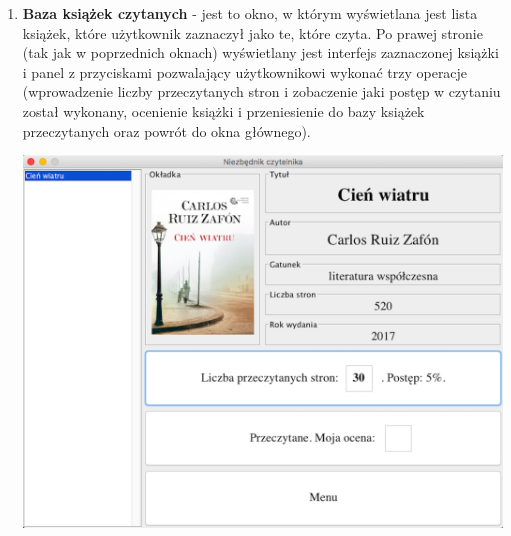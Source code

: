 \documentclass[a4paper,10pt]{article}
\begin{document}
\begin{enumerate}
\item \textbf{Baza książek czytanych } - jest to okno, w którym wyświetlana jest lista książek, które użytkownik zaznaczył jako te, które czyta. Po prawej stronie (tak jak w poprzednich oknach)
wyświetlany jest interfejs zaznaczonej książki i panel z przyciskami pozwalający użytkownikowi wykonać trzy operacje (wprowadzenie liczby przeczytanych stron i zobaczenie jaki postęp w czytaniu został wykonany, ocenienie książki i przeniesienie do bazy książek przeczytanych oraz powrót do okna głównego).
\begin{center}
\includegraphics[scale=0.18]{BazaKsiazekCzytanych.png}
\end{center}


\end{enumerate}
\end{document}
